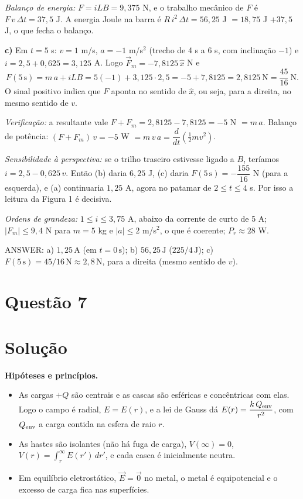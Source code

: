 \documentclass{article}%
\begin{document}
\textit{Balanço de energia:} $F=iLB=9{,}375$ N, e o trabalho mecânico de $F$ é $F\,v\,\Delta t=37{,}5$ J. A energia Joule na barra é $R\,i^2\,\Delta t=56{,}25$ J $=18{,}75$ J $+37{,}5$ J, o que fecha o balanço.

\textbf{c)} Em $t=5$ s: $v=1$ m/s, $a=-1$ m/s$^2$ (trecho de 4 s a 6 s, com inclinação $-1$) e $i=2{,}5+0{,}625=3{,}125$ A. Logo $\vec F_m=-7{,}8125\,\hat x$ N e
\[
F(5\,\text{s})=m\,a+iLB=5(-1)+3{,}125\cdot 2{,}5=-5+7{,}8125=2{,}8125\ \text{N}=\frac{45}{16}\ \text{N}.
\]
O sinal positivo indica que $F$ aponta no sentido de $\hat x$, ou seja, para a direita, no mesmo sentido de $v$.

\textit{Verificação:} a resultante vale $F+F_m=2{,}8125-7{,}8125=-5$ N $=m\,a$. Balanço de potência: $(F+F_m)\,v=-5$ W $=m\,v\,a=\dfrac{d}{dt}\!\left(\tfrac12 m v^2\right)$.

\textit{Sensibilidade à perspectiva:} se o trilho traseiro estivesse ligado a $B$, teríamos $i=2{,}5-0{,}625\,v$. Então (b) daria $6{,}25$ J, (c) daria $F(5\,\text{s})=-\dfrac{155}{16}$ N (para a esquerda), e (a) continuaria $1{,}25$ A, agora no patamar de $2\le t\le 4$ s. Por isso a leitura da Figura 1 é decisiva.

\textit{Ordens de grandeza:} $1\le i\le 3{,}75$ A, abaixo da corrente de curto de 5 A; $|F_m|\le 9{,}4$ N para $m=5$ kg e $|a|\le 2$ m/s$^2$, o que é coerente; $P_r\approx 28$ W.

ANSWER: a) $1{,}25\,\text{A}$ (em $t=0\,\text{s}$); b) $56{,}25\,\text{J}$ ($225/4\,\text{J}$); c) $F(5\,\text{s})=45/16\,\text{N}\approx 2{,}8\,\text{N}$, para a direita (mesmo sentido de $v$).%
\newpage%
\section*{Questão 7}

\section*{Solução}

\textbf{Hipóteses e princípios.}
\begin{itemize}
\item As cargas $+Q$ são centrais e as cascas são esféricas e concêntricas com elas. Logo o campo é radial, $E=E(r)$, e a lei de Gauss dá $E(r)=\dfrac{k\,Q_{\rm env}}{r^2}$, com $Q_{\rm env}$ a carga contida na esfera de raio $r$.
\item As hastes são isolantes (não há fuga de carga), $V(\infty)=0$, $V(r)=\displaystyle\int_r^{\infty}E(r')\,dr'$, e cada casca é inicialmente neutra.
\item Em equilíbrio eletrostático, $\vec E=\vec 0$ no metal, o metal é equipotencial e o excesso de carga fica nas superfícies.
\end{itemize}
\end{document}
